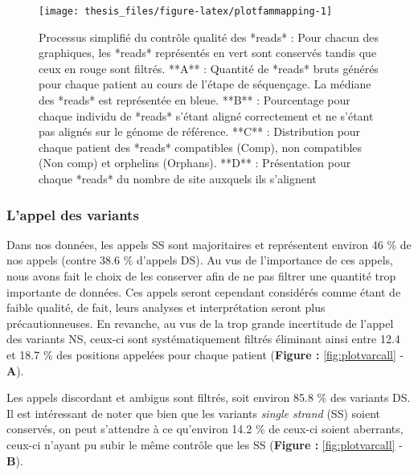 \documentclass[12pt,twoside]{reedthesis}
\theoremstyle{definition}
\theoremstyle{definition}
\theoremstyle{remark}
\begin{document}
  \newpage 
  
  \begin{figure}
  
  {\centering \texttt{[image: thesis\_files/figure-latex/plotfammapping-1]} 
  
  }
  
  \caption[Processus simplifié du contrôle qualité des *reads*]{Processus simplifié du contrôle qualité des *reads* : Pour chacun des graphiques, les *reads* représentés en vert sont conservés tandis que ceux en rouge sont filtrés. **A** : Quantité de *reads* bruts générés pour chaque patient au cours de l'étape de séquençage. La médiane des *reads* est représentée en bleue. **B** : Pourcentage pour chaque individu de *reads* s'étant aligné correctement et ne s'étant pas alignés sur le génome de référence. **C** : Distribution pour chaque patient des *reads* compatibles (Comp), non compatibles (Non comp) et orphelins (Orphans). **D** : Présentation pour chaque *reads* du nombre de site auxquels ils s'alignent}\label{fig:plotfammapping}
  \end{figure}
  
  \newpage  
  
  \subsubsection{L'appel des variants}\label{lappel-des-variants-1}
  
  Dans nos données, les appels SS sont majoritaires et représentent
  environ 46 \% de nos appels (contre 38.6 \% d'appels DS). Au vus de
  l'importance de ces appels, nous avons fait le choix de les conserver
  afin de ne pas filtrer une quantité trop importante de données. Ces
  appels seront cependant considérés comme étant de faible qualité, de
  fait, leurs analyses et interprétation seront plus précautionneuses. En
  revanche, au vus de la trop grande incertitude de l'appel des variants
  NS, ceux-ci sont systématiquement filtrés éliminant ainsi entre 12.4 et
  18.7 \% des positions appelées pour chaque patient (\textbf{Figure :
  }\ref{fig:plotvarcall} - \textbf{A}).
  
  Les appels discordant et ambigus sont filtrés, soit environ 85.8 \% des
  variants DS. Il est intéressant de noter que bien que les variants
  \emph{single strand} (SS) soient conservés, on peut s'attendre à ce
  qu'environ 14.2 \% de ceux-ci soient aberrants, ceux-ci n'ayant pu subir
  le même contrôle que les SS (\textbf{Figure : }\ref{fig:plotvarcall} -
  \textbf{B}).
  
\end{document}
